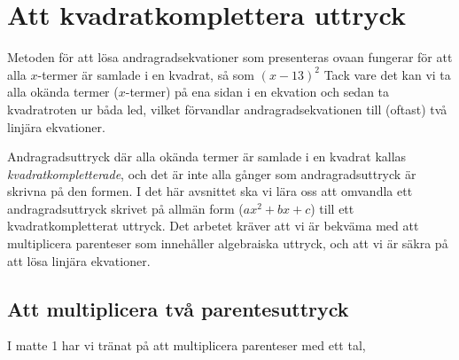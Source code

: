 \section{Att kvadratkomplettera uttryck}

Metoden för att lösa andragradsekvationer som presenteras ovaan fungerar för att alla $x$-termer är samlade i en kvadrat, så som $(x - 13)^2$
Tack vare det kan vi ta alla okända termer ($x$-termer) på ena sidan i en ekvation och sedan ta kvadratroten ur båda led, vilket förvandlar andragradsekvationen till (oftast) två linjära ekvationer.

Andragradsuttryck där alla okända termer är samlade i en kvadrat kallas \emph{kvadratkompletterade}, och det är inte alla gånger som andragradsuttryck är skrivna på den formen.
I det här avsnittet ska vi lära oss att omvandla ett andragradsuttryck skrivet på allmän form ($ax^2 + bx + c$) till ett kvadratkompletterat uttryck.
Det arbetet kräver att vi är bekväma med att multiplicera parenteser som innehåller algebraiska uttryck, och att vi är säkra på att lösa linjära ekvationer.

\subsection{Att multiplicera två parentesuttryck}

I matte 1 har vi tränat på att multiplicera parenteser med ett tal, 
